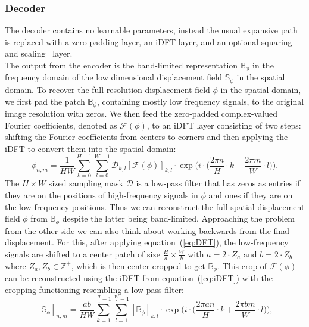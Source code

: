 \subsubsection{Decoder} \label{SubSubSec:Decoder}
The decoder contains no learnable parameters, instead the usual expansive path is replaced with a zero-padding layer, an iDFT layer, and an optional squaring and scaling~\cite{ScaleAndSquare} layer. \\
The output from the encoder is the band-limited representation $\mathbb{B}_\phi$ in the frequency domain of the low dimensional displacement field $\mathbb{S}_\phi$ in the spatial domain. To recover the full-resolution displacement field $\phi$ in the spatial domain, we first pad the patch $\mathbb{B}_\phi$, containing mostly low frequency signals, to the original image resolution with zeros. We then feed the zero-padded complex-valued Fourier coefficients, denoted as $\mathcal{F}(\phi)$, to an iDFT layer consisting of two steps: shifting the Fourier coefficients from centers to corners and then applying the iDFT to convert them into the spatial domain:
\begin{equation} \label{eq:iDFT}
	\phi_{n,m} = \frac{1}{HW} \sum^{H-1}_{k=0} \sum^{W-1}_{l=0} \mathcal{D}_{k,l} [\mathcal{F}(\phi)]_{k,l} \cdot \exp \Bigg(i \cdot \bigg(\frac{2 \pi n}{H} \cdot k + \frac{2 \pi m}{W} \cdot l \bigg) \Bigg).
\end{equation}
The $H \times W$ sized sampling mask $\mathcal{D}$ is a low-pass filter that has zeros as entries if they are on the positions of high-frequency signals in $\phi$ and ones if they are on the low-frequency positions. Thus we can reconstruct the full spatial displacement field $\phi$ from $\mathbb{B}_\phi$ despite the latter being band-limited. Approaching the problem from the other side we can also think about working backwards from the final displacement. For this, after applying equation~(\ref{eq:DFT}), the low-frequency signals are shifted to a center patch of size $\frac{H}{a} \times \frac{W}{b}$ with $a = 2 \cdot Z_a$ and $ b = 2 \cdot Z_b$ where $ Z_a, Z_b \in \mathbb{Z}^+$, which is then center-cropped to get $\mathbb{B}_\phi$. This crop of $\mathcal{F}(\phi)$ can be reconstructed using the iDFT from equation~(\ref{eq:iDFT}) with the cropping functioning resembling a low-pass filter:
\begin{equation} \label{eq:decoder}
	[\mathbb{S}_\phi]_{n,m} = \frac{ab}{HW} \sum^{\frac{H}{a}-1}_{k=1} \sum^{\frac{W}{b}-1}_{l=1} [\mathbb{B}_\phi]_{k,l} \cdot \exp \Bigg(i \cdot \bigg(\frac{2 \pi a n}{H} \cdot k + \frac{2 \pi b m}{W} \cdot l \bigg) \Bigg),
\end{equation}
